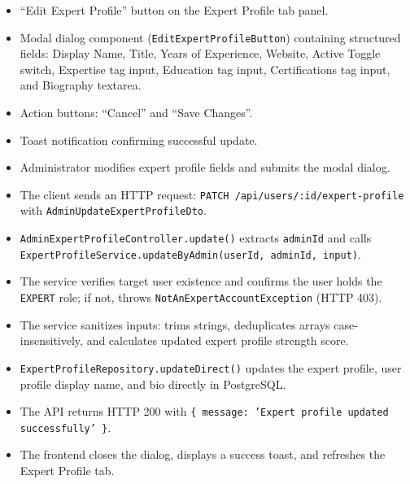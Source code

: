 \begin{itemize}[leftmargin=1.6em,topsep=3pt,itemsep=2pt,parsep=0pt,label=$\bullet$]
    \item ``Edit Expert Profile'' button on the Expert Profile tab panel.
    \item Modal dialog component (\texttt{EditExpertProfileButton}) containing structured fields: Display Name, Title, Years of Experience, Website, Active Toggle switch, Expertise tag input, Education tag input, Certifications tag input, and Biography textarea.
    \item Action buttons: ``Cancel'' and ``Save Changes''.
    \item Toast notification confirming successful update.
\end{itemize}

\begin{itemize}[leftmargin=1.6em,topsep=3pt,itemsep=2pt,parsep=0pt,label=$\bullet$]
    \item Administrator modifies expert profile fields and submits the modal dialog.
    \item The client sends an HTTP request: \texttt{PATCH /api/users/:id/expert-profile} with \texttt{AdminUpdateExpertProfileDto}.
    \item \texttt{AdminExpertProfileController.update()} extracts \texttt{adminId} and calls \texttt{ExpertProfileService.updateByAdmin(userId, adminId, input)}.
    \item The service verifies target user existence and confirms the user holds the \texttt{EXPERT} role; if not, throws \texttt{NotAnExpertAccountException} (HTTP 403).
    \item The service sanitizes inputs: trims strings, deduplicates arrays case-insensitively, and calculates updated expert profile strength score.
    \item \texttt{ExpertProfileRepository.updateDirect()} updates the expert profile, user profile display name, and bio directly in PostgreSQL.
    \item The API returns HTTP 200 with \texttt{\{ message: 'Expert profile updated successfully' \}}.
    \item The frontend closes the dialog, displays a success toast, and refreshes the Expert Profile tab.
\end{itemize}

